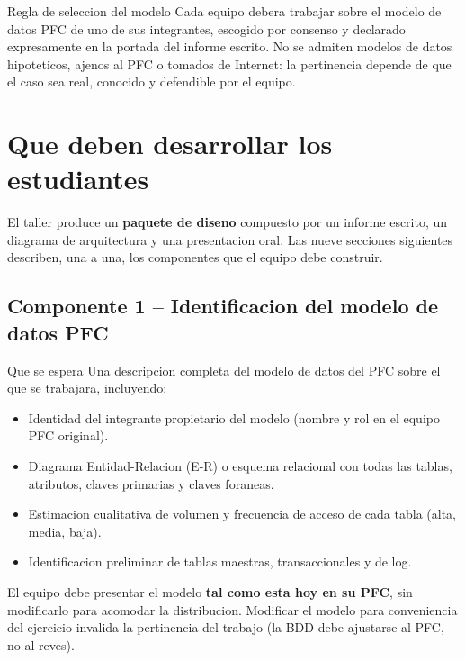\documentclass[11pt,a4paper]{article}
\begin{document}
\begin{cajaalerta}{Regla de seleccion del modelo}
Cada equipo debera trabajar sobre el modelo de datos PFC de uno de sus integrantes, escogido por consenso y declarado expresamente en la portada del informe escrito. No se admiten modelos de datos hipoteticos, ajenos al PFC o tomados de Internet: la pertinencia depende de que el caso sea real, conocido y defendible por el equipo.
\end{cajaalerta}

\newpage
\section{Que deben desarrollar los estudiantes}

El taller produce un \textbf{paquete de diseno} compuesto por un informe escrito, un diagrama de arquitectura y una presentacion oral. Las nueve secciones siguientes describen, una a una, los componentes que el equipo debe construir.

\subsection{Componente 1 -- Identificacion del modelo de datos PFC}

\begin{cajadefinicion}{Que se espera}
Una descripcion completa del modelo de datos del PFC sobre el que se trabajara, incluyendo:
\begin{itemize}
\item Identidad del integrante propietario del modelo (nombre y rol en el equipo PFC original).
\item Diagrama Entidad-Relacion (E-R) o esquema relacional con todas las tablas, atributos, claves primarias y claves foraneas.
\item Estimacion cualitativa de volumen y frecuencia de acceso de cada tabla (alta, media, baja).
\item Identificacion preliminar de tablas maestras, transaccionales y de log.
\end{itemize}
\end{cajadefinicion}

El equipo debe presentar el modelo \textbf{tal como esta hoy en su PFC}, sin modificarlo para acomodar la distribucion. Modificar el modelo para conveniencia del ejercicio invalida la pertinencia del trabajo (la BDD debe ajustarse al PFC, no al reves).
\end{document}
